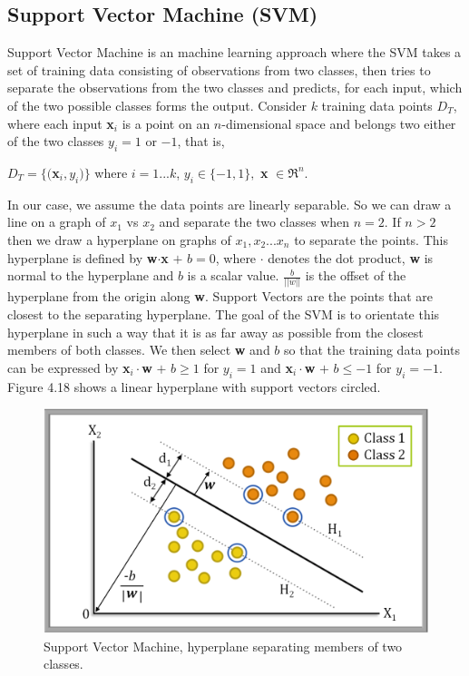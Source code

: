 \subsection{Support Vector Machine (SVM)} Support Vector Machine is an machine learning approach where the SVM takes a set of training data consisting of observations from two classes, then tries to separate the observations from the two classes and predicts, for each input, which of the two possible classes forms the output. Consider $k$ training data points $D_{T}$, where each input \textbf{x}$_{i}$ is a point on an $n$-dimensional space and belongs two either of the two classes $y_{i} = 1$ or $-1$, that is,\begin{center} $D_{T} = \{($\textbf{x}$_{i},y_{i})\}$ where $ i = 1...k$,  $y_{i} \in \{-1,1\}, $ \textbf{x} $ \in \Re^{n}$.\end{center} In our case, we assume the data points are linearly separable. So we can draw a line on a graph of $x_{1}$ vs $x_{2}$ and separate the two classes when $n=2$. If $n>2$ then we draw a hyperplane on graphs of $x_{1},x_{2}...x_{n}$ to separate the points. This hyperplane is defined by \textbf{w}$\cdot$\textbf{x} $+$ $b = 0$, where $\cdot$ denotes the dot product, \textbf{w} is normal to the hyperplane and $b$ is a scalar value. $\frac{b}{||w||}$ is the offset of the hyperplane from the origin along \textbf{w}. Support Vectors are the points that are closest to the separating hyperplane. The goal of the SVM is to orientate this hyperplane in such a way that it is as far away as possible from the closest members of both classes. We then select \textbf{w} and $b$ so that the training data points can be expressed by \textbf{x}$_{i}\cdot$\textbf{w} $+$ $b \geq 1$ for $y_{i} = 1$ and \textbf{x}$_{i}\cdot$\textbf{w} $+$ $b \leq -1$ for $y_{i} = -1.$  Figure 4.18 shows a linear hyperplane with support vectors circled.

\begin{figure}[H]\label{svm}
  \centering
  \includegraphics[width=4.5in]{figs/svm}
  \caption[Options for users who choose not to upload their matrix.]
   {Support Vector Machine, hyperplane separating members of two classes.}
\end{figure}

